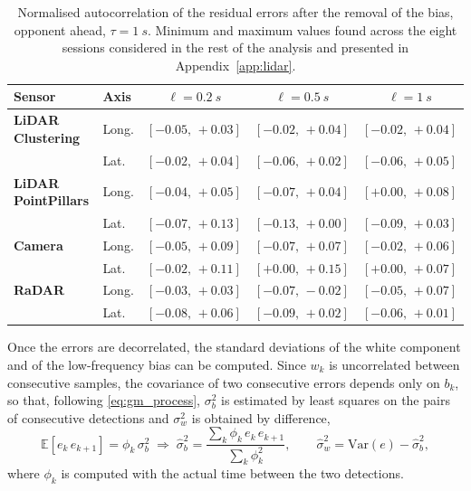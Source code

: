 \begin{table}[H]
\centering
\small
\setlength{\tabcolsep}{4pt}
\begin{tabular}{|llccc|}
\hline
\rowcolor{bluepoli!40} \textbf{Sensor} & \textbf{Axis} & \textbf{$\ell=\SI{0.2}{s}$} & \textbf{$\ell=\SI{0.5}{s}$} & \textbf{$\ell=\SI{1}{s}$} \\
\hline\hline
\textbf{LiDAR Clustering} & Long. & $[-0.05,\,+0.03]$ & $[-0.02,\,+0.04]$ & $[-0.02,\,+0.04]$ \\
 & Lat. & $[-0.02,\,+0.04]$ & $[-0.06,\,+0.02]$ & $[-0.06,\,+0.05]$ \\
\hline
\textbf{LiDAR PointPillars} & Long. & $[-0.04,\,+0.05]$ & $[-0.07,\,+0.04]$ & $[+0.00,\,+0.08]$ \\
 & Lat. & $[-0.07,\,+0.13]$ & $[-0.13,\,+0.00]$ & $[-0.09,\,+0.03]$ \\
\hline
\textbf{Camera} & Long. & $[-0.05,\,+0.09]$ & $[-0.07,\,+0.07]$ & $[-0.02,\,+0.06]$ \\
 & Lat. & $[-0.02,\,+0.11]$ & $[+0.00,\,+0.15]$ & $[+0.00,\,+0.07]$ \\
\hline
\textbf{RaDAR} & Long. & $[-0.03,\,+0.03]$ & $[-0.07,\,-0.02]$ & $[-0.05,\,+0.07]$ \\
 & Lat. & $[-0.08,\,+0.06]$ & $[-0.09,\,+0.02]$ & $[-0.06,\,+0.01]$ \\
\hline
\end{tabular}
\caption{Normalised autocorrelation of the residual errors after the removal of the bias,
opponent ahead, $\tau = \SI{1}{s}$. Minimum and maximum values found across the eight sessions
considered in the rest of the analysis and presented in Appendix~\ref{app:lidar}.}
\label{tab:acf_gm}
\end{table}
Once the errors are decorrelated, the standard deviations of the white component and of the
low-frequency bias can be computed. Since $w_k$ is uncorrelated between consecutive samples,
the covariance of two consecutive errors depends only on $b_k$, so that, following
\eqref{eq:gm_process}, $\sigma_b^2$ is estimated by least squares on the pairs of consecutive
detections and $\sigma_w^2$ is obtained by difference,
\begin{equation}
    \mathbb{E}\left[e_k\, e_{k+1}\right] = \phi_k\, \sigma_b^2
    \;\Rightarrow\;
    \hat{\sigma}_b^2 = \frac{\sum_k \phi_k\, e_k\, e_{k+1}}{\sum_k \phi_k^2},
    \qquad
    \hat{\sigma}_w^2 = \mathrm{Var}(e) - \hat{\sigma}_b^2,
    \label{eq:gm_sigmas}
\end{equation}
where $\phi_k$ is computed with the actual time between the two detections.

